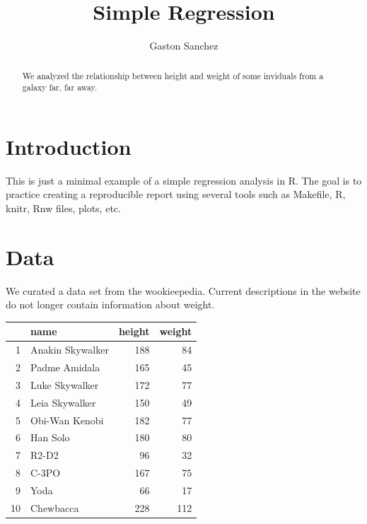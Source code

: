 \documentclass{article}\usepackage[]{graphicx}\usepackage[]{color}
\title{Simple Regression}
\author{Gaston Sanchez}
\begin{document}
\maketitle



\begin{abstract}
We analyzed the relationship between height and weight of some inviduals from a galaxy far, far away.
\end{abstract}


\section{Introduction}
This is just a minimal example of a simple regression analysis in R. The goal is to practice creating a reproducible report using several tools such as Makefile, R, knitr, Rnw files, plots, etc.

\section{Data}
We curated a data set from the wookieepedia. Current descriptions in the website do not longer contain information about weight.

\begin{table}[ht]
\centering
\begin{tabular}{rlrr}
  \hline
 & name & height & weight \\ 
  \hline
1 & Anakin Skywalker & 188 &  84 \\ 
  2 & Padme Amidala & 165 &  45 \\ 
  3 & Luke Skywalker & 172 &  77 \\ 
  4 & Leia Skywalker & 150 &  49 \\ 
  5 & Obi-Wan Kenobi & 182 &  77 \\ 
  6 & Han Solo & 180 &  80 \\ 
  7 & R2-D2 &  96 &  32 \\ 
  8 & C-3PO & 167 &  75 \\ 
  9 & Yoda &  66 &  17 \\ 
  10 & Chewbacca & 228 & 112 \\ 
   \hline
\end{tabular}
\end{table}
\end{document}
